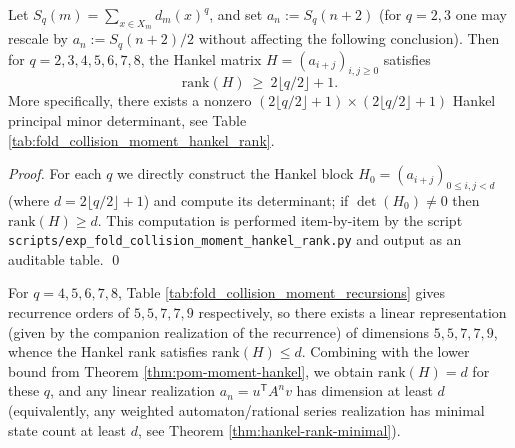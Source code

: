 \begin{theorem}\label{thm:pom-moment-hankel}
Let \(S_q(m)=\sum_{x\in X_m} d_m(x)^q\), and set \(a_n:=S_q(n+2)\) (for \(q=2,3\) one may rescale by \(a_n:=S_q(n+2)/2\) without affecting the following conclusion). Then for \(q=2,3,4,5,6,7,8\), the Hankel matrix \(H=(a_{i+j})_{i,j\ge 0}\) satisfies
\[
\mathrm{rank}(H)\ \ge\ 2\lfloor q/2\rfloor+1.
\]
More specifically, there exists a nonzero \((2\lfloor q/2\rfloor+1)\times(2\lfloor q/2\rfloor+1)\) Hankel principal minor determinant, see Table \ref{tab:fold_collision_moment_hankel_rank}.
\end{theorem}
\begin{proof}
For each \(q\) we directly construct the Hankel block \(H_0=(a_{i+j})_{0\le i,j<d}\) (where \(d=2\lfloor q/2\rfloor+1\)) and compute its determinant; if \(\det(H_0)\neq 0\) then \(\mathrm{rank}(H)\ge d\). This computation is performed item-by-item by the script \texttt{scripts/exp\_fold\_collision\_moment\_hankel\_rank.py} and output as an auditable table. \qed
\end{proof}

\begin{corollary}\label{cor:pom-moment-minreal}
For \(q=4,5,6,7,8\), Table \ref{tab:fold_collision_moment_recursions} gives recurrence orders of \(5,5,7,7,9\) respectively, so there exists a linear representation (given by the companion realization of the recurrence) of dimensions \(5,5,7,7,9\), whence the Hankel rank satisfies \(\mathrm{rank}(H)\le d\). Combining with the lower bound from Theorem \ref{thm:pom-moment-hankel}, we obtain \(\mathrm{rank}(H)=d\) for these \(q\), and any linear realization \(a_n=u^{\mathsf T}A^n v\) has dimension at least \(d\) (equivalently, any weighted automaton/rational series realization has minimal state count at least \(d\), see Theorem \ref{thm:hankel-rank-minimal}).
\end{corollary}



